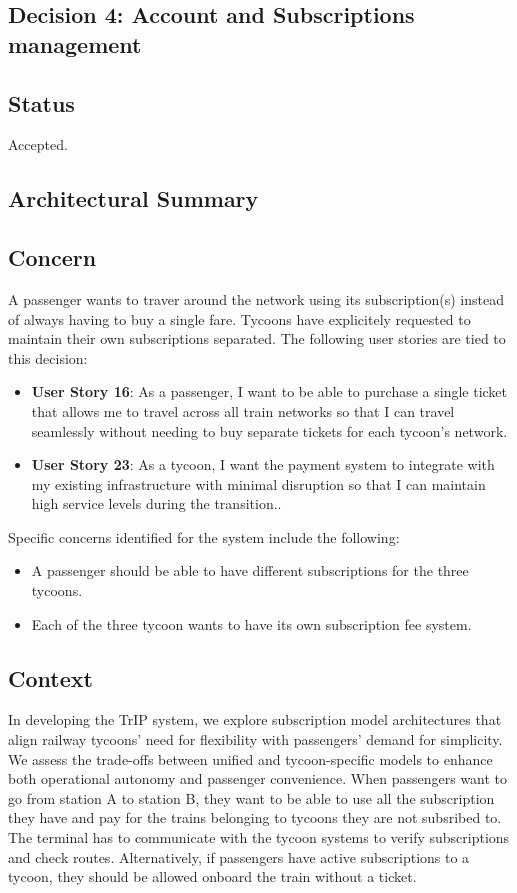 \subsection{Decision 4: Account and Subscriptions management}

\subsection*{Status}
Accepted.

\subsection*{Architectural Summary}


\subsection*{Concern}
A passenger wants to traver around the network using its subscription(s) instead of always having to buy a single fare.
Tycoons have explicitely requested to maintain their own subscriptions separated.
The following user stories are tied to this decision:
\begin{itemize}
    \item \textbf{User Story 16}: As a passenger, I want to be able to purchase a single ticket that allows me to travel across all train networks so that I can travel seamlessly without needing to buy separate tickets for each tycoon's network.
    \item \textbf{User Story 23}: As a tycoon, I want the payment system to integrate with my existing infrastructure with minimal disruption so that I can maintain high service levels during the transition..
\end{itemize}

Specific concerns identified for the system include the following:
\begin{itemize}
    \item A passenger should be able to have different subscriptions for the three tycoons.
    \item Each of the three tycoon wants to have its own subscription fee system.
\end{itemize}

\subsection*{Context}
In developing the TrIP system, we explore subscription model architectures that align railway tycoons' need for flexibility with passengers' demand for simplicity. 
We assess the trade-offs between unified and tycoon-specific models to enhance both operational autonomy and passenger convenience.
When passengers want to go from station A to station B, they want to be able to use all the subscription they have and pay for the trains belonging to tycoons they are not subsribed to.
The terminal has to communicate with the tycoon systems to verify subscriptions and check routes.
Alternatively, if passengers have active subscriptions to a tycoon, they should be allowed onboard the train without a ticket. 

